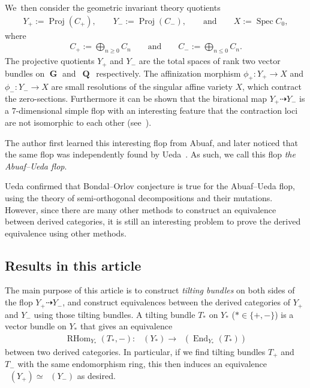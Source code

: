 \documentclass[11pt]{article}
\DeclareMathOperator{\D}{D^b}
\DeclareMathOperator{\End}{End}
\DeclareMathOperator{\G}{\mathbf{G}}
\DeclareMathOperator{\Proj}{Proj}
\DeclareMathOperator{\Q}{\mathbf{Q}}
\DeclareMathOperator{\RHom}{RHom}
\DeclareMathOperator{\Spec}{Spec}
\numberwithin{equation}{section}
\begin{document}
We~then consider the geometric invariant theory quotients
\begin{gather*}
Y_+ := \Proj(C_+),\qquad
Y_- := \Proj(C_-),\qquad \text{and} \qquad
X := \Spec C_0,
\end{gather*}
where
\begin{gather*}
C_+ := \bigoplus_{n \geq 0} C_n \qquad \text{and} \qquad C_- := \bigoplus_{n \leq 0} C_n.
\end{gather*}
The projective quotients $Y_+$ and $Y_-$ are the total spaces of rank two vector bundles on $\G$ and~$\Q$~respectively.
The affinization morphism $\phi_+\colon Y_+ \to X$ and $\phi_-\colon Y_- \to X$ are small resolutions of the singular affine variety $X$,
which contract the zero-sections.
Furthermore it can be shown that the birational map $Y_+ \dashrightarrow Y_-$ is a $7$-dimensional simple flop with an interesting feature
that the contraction loci are not isomorphic to each other (see~\cite{Ued16}).

The author first learned this interesting flop from Abuaf,
and later noticed that the same flop was independently found by Ueda~\cite{Ued16}.
As such, we call this flop \textit{the Abuaf--Ueda flop}.

Ueda confirmed that Bondal--Orlov conjecture is true for the Abuaf--Ueda flop, using the theory of semi-orthogonal decompositions and their mutations.
However, since there are many other methods to construct an equivalence between derived categories,
it is still an interesting problem to prove the derived equivalence using other methods.

\subsection{Results in this article}
The main purpose of this article is to construct \textit{tilting bundles} on both sides of the flop $Y_+ \dashrightarrow Y_-$,
and construct equivalences between the derived categories of $Y_+$ and $Y_-$ using those tilting bundles.
A tilting bundle $T_{\ast}$ on $Y_{\ast}$ ($\ast \in \{ +, - \}$) is a vector bundle on $Y_{\ast}$ that gives an equivalence
\begin{gather*}
\RHom_{Y_{\ast}}(T_{\ast}, -)\colon \ \D(Y_{\ast}) \to \D(\End_{Y_{\ast}}(T_{\ast}))
\end{gather*}
between two derived categories.
In particular, if we find tilting bundles $T_+$ and $T_-$ with the same endomorphism ring, this then induces an equivalence
$\D(Y_+) \simeq \D(Y_-)$ as desired.
\end{document}
